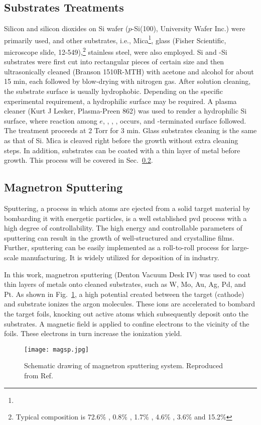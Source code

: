 \subsection{Substrates Treatments}\label{ch2sub}

Silicon and silicon dioxides on Si wafer ($p$-Si(100), University Wafer Inc.) were primarily used, and other substrates, i.e., Mica\footnote{}, glass (Fisher Scientific, microscope slide, 12-549),\footnote{Typical composition is 72.6\% , 0.8\% , 1.7\% , 4.6\% , 3.6\%  and 15.2\% } stainless steel, were also employed. Si and -Si substrates were first cut into rectangular pieces of certain size and then ultrasonically cleaned (Branson 1510R-MTH) with acetone and alcohol for about 15 min, each followed by blow-drying with nitrogen gas. After solution cleaning, the substrate surface is usually hydrophobic. Depending on the specific experimental requirement, a hydrophilic surface may be required. A plasma cleaner (Kurt J Lesker, Plasma-Preen 862) was used to render a hydrophilic Si surface, where reaction among $e$, , , , occurs, and -terminated surface followed.\cite{Habib2010} The treatment proceeds at 2 Torr  for 3 min. Glass substrates cleaning is the same as that of Si. Mica is cleaved right before the growth without extra cleaning steps. In addition, substrates can be coated with a thin layer of metal before growth. This process will be covered in Sec.~\ref{sec:mag}.

\subsection{Magnetron Sputtering}\label{sec:mag}
Sputtering, a process in which atoms are ejected from a solid target material by bombarding it with energetic particles, is a well established \gls{pvd} process with a high degree of controllability. The high energy and controllable parameters of sputtering can result in the growth of well-structured and crystalline films. Further, sputtering can be easily implemented as a roll-to-roll process for large-scale manufacturing. It is widely utilized for deposition of  in industry.

In this work, magnetron sputtering (Denton Vacuum Desk IV) was used to coat thin layers of metals onto cleaned substrates, such as W, Mo, Au, Ag, Pd, and Pt. As shown in Fig.~\ref{fig:ch2magsp}, a high potential created between the target (cathode) and substrate ionizes the argon molecules. These ions are accelerated to bombard the target foils, knocking out active atoms which subsequently deposit onto the substrates. A magnetic field is applied to confine electrons to the vicinity of the foils. These electrons in turn increase the ionization yield. 
\begin{figure}[htb]
\centering
\texttt{[image: magsp.jpg]}
\caption[Schematic drawing of magnetron sputtering system]{Schematic drawing of magnetron sputtering system. Reproduced from Ref.\cite{Song2008}}
\label{fig:ch2magsp}
\end{figure}

